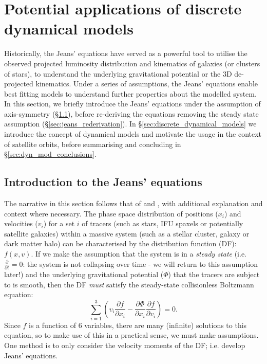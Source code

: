 \section{Potential applications of discrete dynamical models} \label{sec:jam}
Historically, the Jeans' equations have served as a powerful tool to utilise the observed projected luminosity distribution and kinematics of galaxies (or clusters of stars), to understand the underlying gravitational potential or the 3D de-projected kinematics. Under a series of assumptions, the Jeans' equations enable best fitting models to understand further properties about the modelled system. In this section, we briefly introduce the Jeans' equations under the assumption of axis-symmetry (\S\ref{sec:jeans_intro}), before re-deriving the equations removing the steady state assumption (\S\ref{sec:jeans_rederivation}). In \S\ref{sec:discrete_dynamical_models} we introduce the concept of dynamical models and motivate the usage in the context of satellite orbits, before summarising and concluding in \S\ref{sec:dyn_mod_conclusions}. 

\subsection{Introduction to the Jeans' equations} \label{sec:jeans_intro}
The narrative in this section follows that of \citet{cappellari2008} and \citet[BT henceforth;][]{binneytremaine}, with additional explanation and context where necessary. The phase space distribution of positions ($x_{i}$) and velocities ($v_{i}$) for a set $i$ of tracers (such as stars, IFU spaxels or potentially satellite galaxies) within a massive system (such as a stellar cluster, galaxy or dark matter halo) can be characterised by the distribution function (DF): $f(x,v)$. If we make the assumption that the system is in a \textit{steady state} (i.e. $\frac{\partial}{\partial t} = 0$: the system is not collapsing over time - we will return to this assumption later!) and the underlying gravitational potential ($\Phi$) that the tracers are subject to is smooth, then the DF \textit{must} satisfy the steady-state collisionless Boltzmann equation:
\begin{equation}
\sum^{3}_{i=1}\left(v_{i}\frac{\partial f}{\partial x_i} - \frac{\partial \Phi}{\partial x_{i}}\frac{\partial f}{\partial v_{i}} \right) = 0.
\end{equation}
Since $f$ is a function of 6 variables, there are many (infinite) solutions to this equation, so to make use of this in a practical sense, we must make assumptions. One method is to only consider the velocity moments of the DF; i.e. develop Jeans' equations. 

